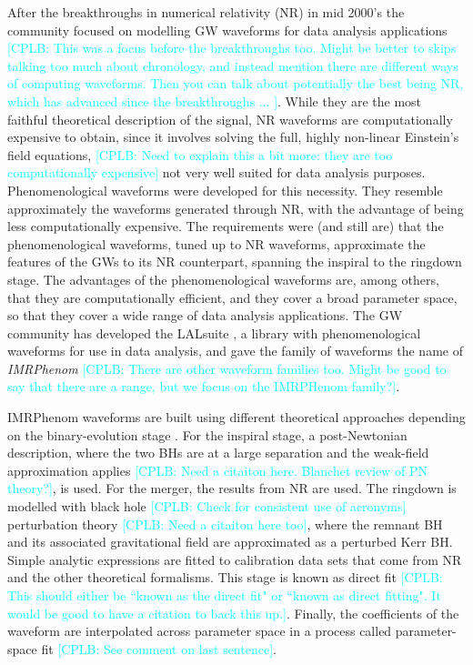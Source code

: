 \documentclass[a4paper,12pt]{article}
\newcommand{\cplb}[1]{\textcolor{cyan}{[CPLB: #1]}}
\begin{document}
After the breakthroughs in numerical relativity (NR) in mid 2000's \cite{campanelli2006accurate,pretorius2005evolution,baker2006gravitational}
the community focused on modelling GW waveforms for data analysis applications \cplb{This was a focus before the breakthroughs too. Might be better to skips talking too much about chronology, and instead mention there are different ways of computing waveforms. Then you can talk about potentially the best being NR, which has advanced since the breakthroughs ... }. 
While they are the most faithful theoretical description of the signal, NR waveforms are computationally expensive to obtain, since it involves solving the full, highly non-linear Einstein's field equations, \cplb{Need to explain this a bit more: they are too computationally expensive} not very well suited for data analysis purposes. 
Phenomenological waveforms were developed for this necessity. 
They resemble approximately the waveforms generated through NR, with the advantage of being less computationally expensive. 
The requirements were (and still are) that the phenomenological waveforms, tuned up to NR waveforms, approximate the features of the GWs to its NR counterpart, spanning the inspiral to the ringdown stage. 
The advantages of the phenomenological waveforms are, among others, that they are computationally efficient, and they cover a broad parameter space, so that they cover a wide range of data analysis applications.
The GW community has developed the LALsuite \cite{wette2020swiglal}, a library with phenomenological waveforms for use in data analysis, and gave the family of waveforms the name of \textit{IMRPhenom} \cplb{There are other waveform families too. Might be good to say that there are a range, but we focus on the IMRPHenom family?}.

IMRPhenom waveforms are built using different theoretical approaches depending on the binary-evolution stage \cite{afshordi2023waveform}. 
For the inspiral stage, a post-Newtonian description, where the two BHs are at a large separation and the weak-field approximation applies \cplb{Need a citaiton here. Blanchet review of PN theory?}, is used. 
For the merger, the results from NR are used. 
The ringdown is modelled with black hole \cplb{Check for consistent use of acronyms} perturbation theory \cplb{Need a citaiton here too}, where the remnant BH and its associated gravitational field are approximated as a perturbed Kerr BH. 
Simple analytic expressions are fitted to calibration data sets that come from NR and the other theoretical formalisms. 
This stage is known as direct fit \cplb{This should either be ``known as the direct fit" or ``known as direct fitting". It would be good to have a citation to back this up.}. 
Finally, the coefficients of the waveform are interpolated across parameter space in a process called parameter-space fit \cplb{See comment on last sentence}.
\end{document}
